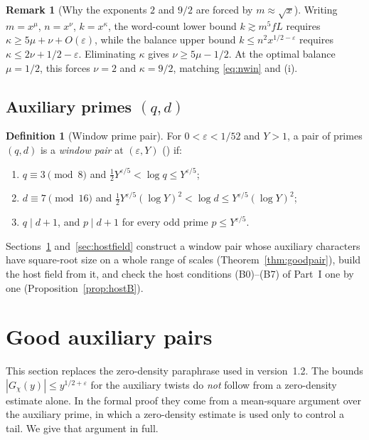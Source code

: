 \documentclass[11pt]{amsart}
\newcommand{\eps}{\varepsilon}
\theoremstyle{plain}
\theoremstyle{definition}
\newtheorem{definition}[theorem]{Definition}
\newtheorem{remark}[theorem]{Remark}
\numberwithin{equation}{section}
\begin{document}
\begin{remark}[Why the exponents $2$ and $9/2$ are forced by $m\approx\sqrt x$]
Writing $m=x^\mu$, $n=x^\nu$, $k=x^\kappa$, the word-count lower bound $k\gtrsim m^5 f L$ requires
$\kappa\ge 5\mu+\nu+O(\eps)$, while the balance upper bound $k\le n^2 x^{1/2-\eps}$ requires
$\kappa\le 2\nu+1/2-\eps$. Eliminating $\kappa$ gives $\nu\ge 5\mu-1/2$. At the optimal balance
$\mu=1/2$, this forces $\nu=2$ and $\kappa=9/2$, matching \eqref{eq:nwin} and (i).
\end{remark}

\subsection{Auxiliary primes $(q,d)$}

\begin{definition}[Window prime pair]\label{def:winpair}
For $0<\eps<1/52$ and $Y>1$, a pair of primes $(q,d)$ is a \emph{window pair} at $(\eps,Y)$
() if:
\begin{enumerate}[label=(\alph*)]
\item $q\equiv3\pmod 8$ and $\frac12 Y^{\eps/5}<\log q\le Y^{\eps/5}$;
\item $d\equiv7\pmod{16}$ and $\frac12 Y^{\eps/5}(\log Y)^2<\log d\le Y^{\eps/5}(\log Y)^2$;
\item $q\mid d+1$, and $p\mid d+1$ for every odd prime $p\le Y^{\eps/5}$.
\end{enumerate}
\end{definition}

Sections~\ref{sec:pairs} and~\ref{sec:hostfield} construct a window pair whose auxiliary
characters have square-root size on a whole range of scales (Theorem~\ref{thm:goodpair}), build
the host field from it, and check the host conditions (B0)--(B7) of Part~I one by one
(Proposition~\ref{prop:hostB}).

\section{Good auxiliary pairs}\label{sec:pairs}

This section replaces the zero-density paraphrase used in version~1.2. The bounds
$|G_\chi(y)|\le y^{1/2+\eps}$ for the auxiliary twists do \emph{not} follow from a zero-density
estimate alone. In the formal proof they come from a mean-square argument over the auxiliary prime,
in which a zero-density estimate is used only to control a tail. We give that argument in full.
\end{document}
